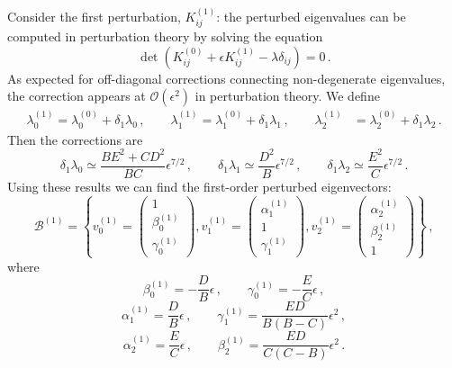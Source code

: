 \documentclass[11pt,a4paper]{article}
\begin{document}
Consider the first perturbation, $ K_{ij}^{(1)}$: the perturbed eigenvalues can be computed in perturbation theory by solving the equation
\begin{equation}
\det\left(K_{ij}^{(0)} + \epsilon K_{ij}^{(1)} - \lambda \delta_{ij}\right) = 0 \,.
\end{equation}
As expected for off-diagonal corrections connecting non-degenerate eigenvalues, the correction appears at $\mathcal{O}(\epsilon^2)$ in perturbation theory. We define
\begin{align}
\lambda^{(1)}_0 = \lambda_0^{(0)} + \delta_1 \lambda_0 \,, \qquad \lambda^{(1)}_1 = \lambda_1^{(0)} + \delta_1 \lambda_1 \,, \qquad \lambda^{(1)}_2 & = \lambda_2^{(0)} + \delta_1 \lambda_2 \,.
\end{align}
Then the corrections are
\begin{equation}
\delta_1 \lambda_0 \simeq \frac{B E^2 + C D^2}{BC} \epsilon^{7/2} \,, \qquad \delta_1 \lambda_1 \simeq \frac{D^2}{B} \epsilon^{7/2} \,, \qquad \delta_1 \lambda_2 \simeq \frac{E^2}{C} \epsilon^{7/2} \,.
\end{equation}
Using these results we can find the first-order perturbed eigenvectors:
\begin{equation}
\mathcal{B}^{(1)} = \left\{ v_0^{(1)} = \begin{pmatrix} 1 \\ \beta_0^{(1)} \\ \gamma_0^{(1)} \end{pmatrix}, v_1^{(1)} =  \begin{pmatrix} \alpha_1^{(1)} \\ 1 \\ \gamma_1^{(1)} \end{pmatrix}, v_2^{(1)} =  \begin{pmatrix} \alpha_2^{(1)} \\ \beta_2^{(1)} \\ 1 \end{pmatrix} \right\} \,,
\end{equation}
where
\begin{equation}
\beta_0^{(1)} = -\frac{D}{B} \epsilon \,, \qquad \gamma_0^{(1)} = - \frac{E}{C} \epsilon \,, \nonumber
\end{equation}
\begin{equation}
\alpha_1^{(1)} = \frac{D}{B} \epsilon \,, \qquad \gamma_1^{(1)} = \frac{ED}{B(B-C)} \epsilon^2 \,, \nonumber
\end{equation}
\begin{equation}
\label{eq:Eigenvec15}
\alpha_2^{(1)} = \frac{E}{C} \epsilon \,, \qquad \beta_2^{(1)} = \frac{ED}{C(C-B)} \epsilon^2 \,.
\end{equation}
\end{document}
